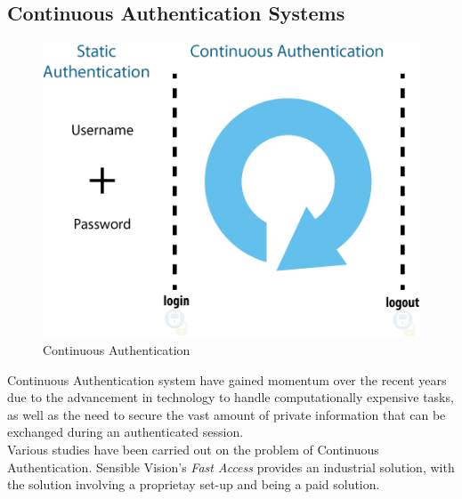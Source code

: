 \documentclass[12pt]{article}			%
\begin{document}
\subsection{ Continuous Authentication Systems }
\begin{figure}
	\centering
		\includegraphics[scale=0.6]{img/ca1.png}
	\caption{Continuous Authentication}
\end{figure}
Continuous Authentication system have gained momentum over the recent years due to the advancement in technology to handle computationally expensive tasks, as well as the need to secure the vast amount of private information that can be exchanged during an authenticated session.\\
Various studies\cite{mon00,turk03,sim07,azz08,azz082,kang06,car03} have been carried out on the problem of Continuous Authentication.
Sensible Vision's \emph{Fast Access} provides an industrial solution, with the solution involving a proprietay set-up and being a paid solution.
\end{document}
